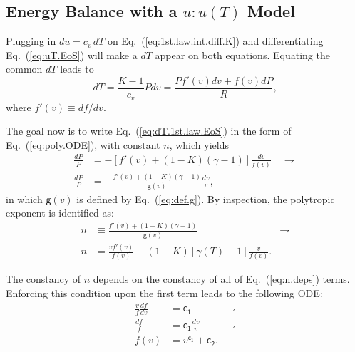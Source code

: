 \documentclass[fleqn,11pt]{SelfArx}
\begin{document}
    \subsection{Energy Balance with a $u\!:\!u(T)$ Model}\label{sec:energy.balance}

    Plugging  in  $du  =  c_v\,dT$  on  Eq.~(\ref{eq:1st.law.int.diff.K})  and   differentiating
    Eq.~(\ref{eq:uT.EoS}) will make a $dT$ appear on both equations. Equating  the  common  $dT$
    leads to
    \begin{equation}
        dT = \frac{K-1}{c_v}Pdv = \frac{Pf'(v)dv + f(v)dP}{R},
        \label{eq:dT.1st.law.EoS}
    \end{equation}
    \noindent where $f'(v) \equiv df/dv$.

    The   goal   now   is   to   write   Eq.~(\ref{eq:dT.1st.law.EoS})   in    the    form    of
    Eq.~(\ref{eq:poly.ODE}), with constant $n$, which yields
    \begin{align}
        \frac{dP}{P} & = - [f'(v) + (1 - K)(\gamma - 1)]\frac{dv}{f(v)}\quad\rightharpoondown\\
        \frac{dP}{P} & = -\frac{f'(v) + (1 - K)(\gamma - 1)}{\mathsf{g}(v)}\frac{dv}{v},
        \label{eq:Pv.ODE}
    \end{align}
    \noindent in which $\mathsf{g}(v)$ is defined by Eq.~(\ref{eq:def.g}).  By  inspection,  the
    polytropic exponent is identified as:
    \begin{align}
        n & \equiv \frac{f'(v) + (1 - K)(\gamma - 1)}{\mathsf{g}(v)} & \rightharpoondown
        \label{eq:n} \\
        n & = \frac{vf'(v)}{f(v)} + (1 - K)[\gamma(T) - 1]\frac{v}{f(v)}.
        \label{eq:n.deps}
    \end{align}

    The constancy of $n$ depends  on  the  constancy  of  all  of  Eq.~(\ref{eq:n.deps})  terms.
    Enforcing this condition upon the first term leads to the following ODE:
    \begin{align}
        \frac{v}{f}\frac{df}{dv} & = \mathsf{c_1} & \rightharpoondown \\
        \frac{df}{f} & = \mathsf{c_1}\frac{dv}{v} & \rightharpoondown \\
        f(v) & = v^{\mathsf{c_1}} + \mathsf{c_2}.
        \label{eq:f.two.consts}
    \end{align}
\end{document}
